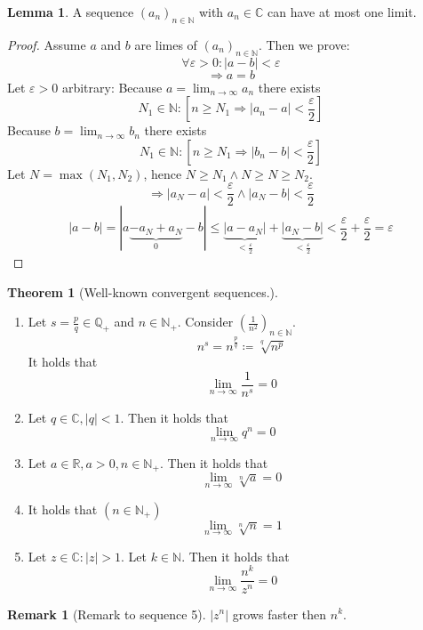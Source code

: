 \documentclass[a4paper,landscape,twocolumn]{article}
\theoremstyle{definition}
\newtheorem{theorem}{Theorem}
\newtheorem{rem}{Remark}
\newtheorem{lemma}{Lemma}
\newcommand\abs[1]{\left|#1\right|}
\begin{document}
\begin{lemma}
  A sequence $(a_n)_{n \in \mathbb N}$ with $a_n \in \mathbb C$ can have at most one limit.
\end{lemma}
\begin{proof}
  Assume $a$ and $b$ are limes of $(a_n)_{n \in \mathbb N}$. Then we prove:
  \[ \forall \varepsilon > 0: \abs{a - b} < \varepsilon \]
  \[ \Rightarrow a = b \]
  Let $\varepsilon > 0$ arbitrary:
  Because $a = \lim_{n \to \infty} a_n$ there exists
  \[ N_1 \in \mathbb N: \left[n \geq N_1 \Rightarrow \abs{a_n - a} < \frac{\varepsilon}2\right] \]
  Because $b = \lim_{n \to \infty} b_n$ there exists
  \[ N_1 \in \mathbb N: \left[n \geq N_1 \Rightarrow \abs{b_n - b} < \frac{\varepsilon}2\right] \]
  Let $N = \max(N_1, N_2)$, hence $N \geq N_1 \land N \geq N \geq N_2$.
  \[ \Rightarrow \abs{a_N - a} < \frac{\varepsilon}{2} \land \abs{a_N - b} < \frac{\varepsilon}{2} \]
  \[ \abs{a - b} = |a \underbrace{- a_N + a_N}_0 - b| \leq \underbrace{\abs{a - a_N}}_{< \frac{\varepsilon}2} + \underbrace{\abs{a_N - b}}_{< \frac{\varepsilon}2} < \frac{\varepsilon}{2} + \frac{\varepsilon}{2} = \varepsilon \]
\end{proof}

\begin{theorem}[Well-known convergent sequences.] \hfill{}
  \begin{enumerate}
    \item
      Let $s = \frac pq \in \mathbb Q_+$ and $n \in \mathbb N_+$. Consider $\left(\frac 1{n^2}\right)_{n \in \mathbb N}$.
      \[ n^s = n^{\frac pq} \coloneqq \sqrt[q]{n^p} \]
      It holds that
      \[ \lim_{n \to \infty} \frac{1}{n^s} = 0 \]
    \item Let $q \in \mathbb C, \abs{q} < 1$. Then it holds that
      \[ \lim_{n \to \infty} q^n = 0 \]
    \item Let $a \in \mathbb R, a > 0, n \in \mathbb N_+$. Then it holds that
      \[ \lim_{n \to \infty} \sqrt[n]{a} = 0 \]
    \item It holds that $(n \in \mathbb N_+)$
      \[ \lim_{n \to \infty} \sqrt[n]{n} = 1 \]
    \item Let $z \in \mathbb C: \abs{z} > 1$. Let $k \in \mathbb N$.
      Then it holds that \[ \lim_{n \to \infty} \frac{n^k}{z^n} = 0 \]
  \end{enumerate}
\end{theorem}

\begin{rem}[Remark to sequence 5]
  $\abs{z^n}$ grows faster then $n^k$.
\end{rem}
\end{document}
